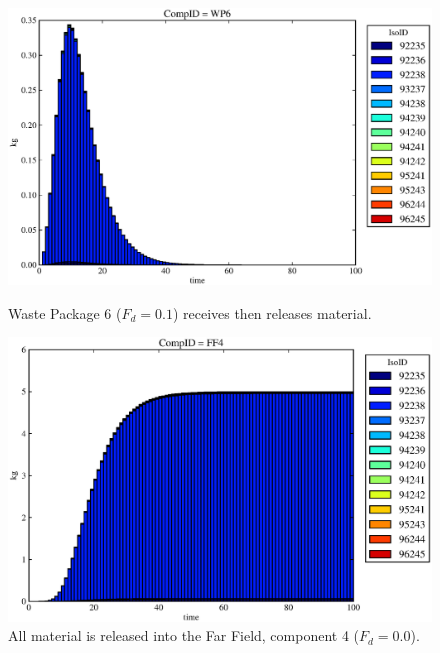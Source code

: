 \begin{figure}[ht]
\begin{minipage}[b]{0.45\linewidth}
\end{minipage}
\hspace{0.05\linewidth}
\begin{minipage}[b]{0.45\linewidth}
  \includegraphics[width=\textwidth]{./chapters/demonstration/base/mcIII2.eps}
  \caption[Case MCII Waste Package Contaminants.]{ 
    Waste Package 6 ($F_d = 0.1$) receives then releases material. 
    }
  \label{fig:mcIIIwp6}

  \includegraphics[width=\textwidth]{./chapters/demonstration/base/mcIII0.eps}
  \caption[Case MCII Waste Package Contaminants.]{All material is released into the Far Field, component 4 ($F_d=0.0$).}
  \label{fig:mcII}


  \end{minipage}
\end{figure}

